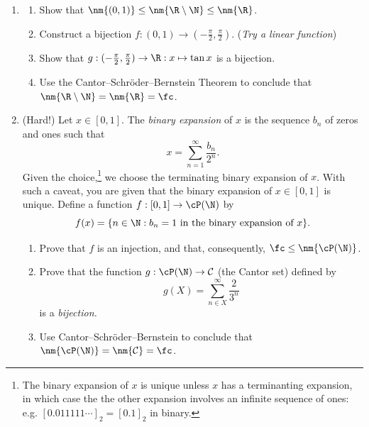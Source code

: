 \begin{exercises}{}{}
\begin{enumerate}
	\item\begin{enumerate}
  		\item Show that $\nm{(0,1)}\le\nm{\R\setminus\N}\le\nm{\R}$.
  		\item Construct a bijection $f:(0,1)\to (-\frac\pi 2,\frac\pi 2)$. (\emph{Try a linear function})
  		\item Show that $g:(-\frac\pi 2,\frac\pi 2)\to\R:x\mapsto\tan x$ is a bijection.
  		\item Use the Cantor--Schr\"oder--Bernstein Theorem to conclude that $\nm{\R\setminus\N}=\nm{\R}=\fc$.
  	\end{enumerate}
  	
  		
	\item (Hard!) Let $x\in[0,1]$. The \emph{binary expansion} of $x$ is the sequence $b_n$ of zeros and ones such that
  \[x=\sum_{n=1}^\infty \frac{b_n}{2^n}.\]
  Given the choice,\footnote{The binary expansion of $x$ is unique unless $x$ has a terminanting expansion, in which case the the other expansion involves an infinite sequence of ones: e.g. $[0.011111\cdots]_2=[0.1]_2$ in binary.} we choose the terminating binary expansion of $x$. With such a caveat, you are given that the binary expansion of $x\in[0,1]$ is unique. Define a function $f:[0,1]\to\cP(\N)$ by
  \[f(x)=\{n\in\N:b_n=1\text{ in the binary expansion of $x$}\}.\]
  \begin{enumerate}
    \item Prove that $f$ is an injection, and that, consequently, $\fc\le\nm{\cP(\N)}$.
		\item Prove that the function $g:\cP(\N)\to\mathcal C$ (the Cantor set) defined by
		\[g(X)=\sum\limits_{n\in X}^\infty\frac{2}{3^n}\]
		is a \emph{bijection.}
		\item Use Cantor--Schr\"oder--Bernstein to conclude that $\nm{\cP(\N)}=\nm{\mathcal C}=\fc$.
	\end{enumerate}
	

\end{enumerate}
\end{exercises}

